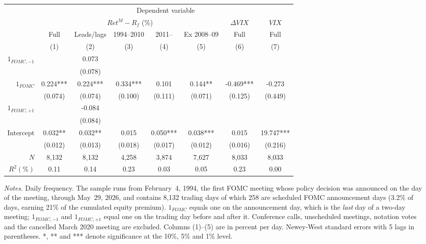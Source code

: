 \begin{tabular}{rccccccc}
\hline\hline
{} & \multicolumn{7}{c}{Dependent variable} \\
{} & \multicolumn{5}{c}{$Ret^M-R_f$ (\%)} & $\Delta VIX$ & $VIX$\\
{} & Full & Leads/lags & 1994--2010 & 2011-- & Ex 2008--09 & Full & Full \\
{} & (1) & (2) & (3) & (4) & (5) & (6) & (7)\\
          \cmidrule(lr){2-6}  \cmidrule(lr){7-7}  \cmidrule(lr){8-8}
$1_{FOMC,-1}$ &  & 0.073 &  &  &  &  & \\
 &  & (0.078) &  &  &  &  & \\
$1_{FOMC}$ & 0.224*** & 0.224*** & 0.334*** & 0.101 & 0.144** & -0.469*** & -0.273\\
 & (0.074) & (0.074) & (0.100) & (0.111) & (0.071) & (0.125) & (0.449)\\
$1_{FOMC,+1}$ &  & -0.084 &  &  &  &  & \\
 &  & (0.084) &  &  &  &  & \\
Intercept & 0.032** & 0.032** & 0.015 & 0.050*** & 0.038*** & 0.015 & 19.747***\\
 & (0.012) & (0.013) & (0.018) & (0.017) & (0.012) & (0.016) & (0.216)\\
\midrule \ 
$N$ & 8,132 & 8,132 & 4,258 & 3,874 & 7,627 & 8,033 & 8,033\\
$R^2(\%)$ & 0.11 & 0.14 & 0.23 & 0.03 & 0.05 & 0.23 & 0.00\\
\hline\hline
\end{tabular}

\vspace{0.75em}
\begin{minipage}{\textwidth}
\footnotesize
\textit{Notes.} Daily frequency. The sample runs from February~4, 1994, the first FOMC meeting whose policy decision was announced on the day of the meeting, through May~29, 2026, and contains 8,132 trading days of which 258 are scheduled FOMC announcement days (3.2\% of days, earning 21\% of the cumulated equity premium). $1_{FOMC}$ equals one on the announcement day, which is the \emph{last} day of a two-day meeting; $1_{FOMC,-1}$ and $1_{FOMC,+1}$ equal one on the trading day before and after it. Conference calls, unscheduled meetings, notation votes and the cancelled March 2020 meeting are excluded. Columns (1)--(5) are in percent per day. Newey-West standard errors with 5 lags in parentheses. *, ** and *** denote significance at the 10\%, 5\% and 1\% level.
\end{minipage}
